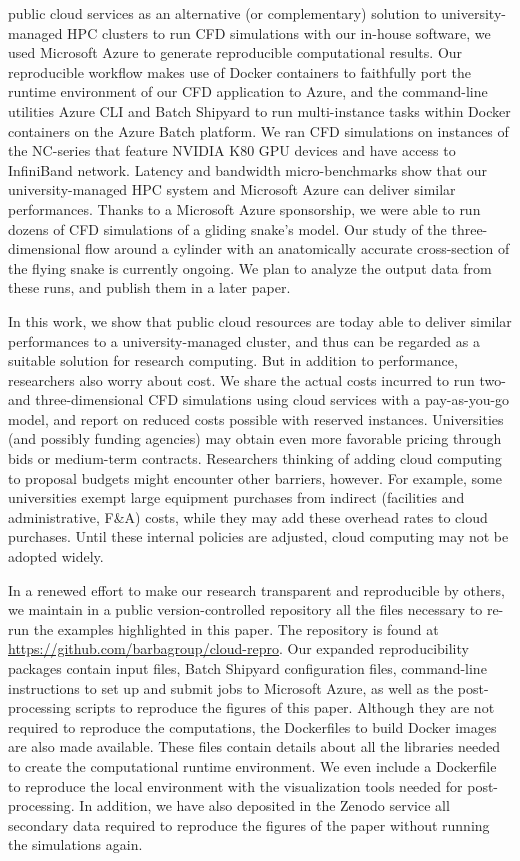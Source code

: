 \documentclass[10pt,journal,compsoc]{IEEEtran}
\begin{document}
\bigskip

 public cloud services as an alternative (or complementary) solution to university-managed HPC clusters to run CFD simulations with our in-house software, we used Microsoft Azure to generate reproducible computational results.
Our reproducible workflow makes use of Docker containers to faithfully port the runtime environment of our CFD application to Azure,
and the command-line utilities Azure CLI and Batch Shipyard to run multi-instance tasks within Docker containers on the Azure Batch platform.
We ran CFD simulations on instances of the NC-series that feature NVIDIA K80 GPU devices and have access to InfiniBand network.
Latency and bandwidth micro-benchmarks show that our university-managed HPC system and Microsoft Azure can deliver similar performances.
Thanks to a Microsoft Azure sponsorship, we were able to run dozens of CFD simulations of a gliding snake's model.
Our study of the three-dimensional flow around a cylinder with an anatomically accurate cross-section of the flying snake is currently ongoing. 
We plan to analyze the output data from these runs, and publish them in a later paper.

In this work, we show that public cloud resources are today able to deliver similar performances to a university-managed cluster, and thus can be regarded as a suitable solution for research computing.
But in addition to performance, researchers also worry about cost.
We share the actual costs incurred to run two- and three-dimensional CFD simulations  using cloud services with a pay-as-you-go model, and report on reduced costs possible with reserved instances.
Universities (and possibly funding agencies) may obtain even more favorable pricing through bids or medium-term contracts.
Researchers thinking of adding cloud computing to proposal budgets might encounter other barriers, however.
For example, some universities exempt large equipment purchases from indirect (facilities and administrative, F\&A)  costs, while they may add these overhead rates to cloud purchases. 
Until these internal policies are adjusted, cloud computing may not be adopted widely.

In a renewed effort to make our research transparent and reproducible by others, we maintain in a public version-controlled repository all the files necessary to re-run the examples highlighted in this paper.
The repository is found at \url{https://github.com/barbagroup/cloud-repro}.
Our expanded reproducibility packages contain input files, Batch Shipyard configuration files, command-line instructions to set up and submit jobs to Microsoft Azure, as well as the post-processing scripts to reproduce the figures of this paper.
Although they are not required to reproduce the computations, the Dockerfiles to build Docker images are also made available. 
These files contain details about all the libraries needed to create the computational runtime environment.
We even include a Dockerfile to reproduce the local environment with the visualization tools needed for post-processing.
In addition, we have also deposited in the Zenodo service all secondary data required to reproduce the figures of the paper without running the simulations again\cite{cloud_repro_2019}.
\end{document}
